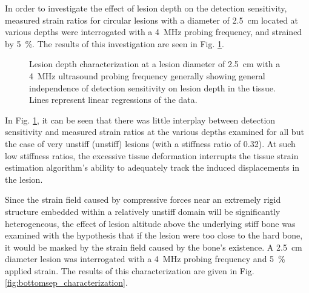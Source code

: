 			In order to investigate the effect of lesion depth on the detection sensitivity, measured strain ratios for circular lesions with a diameter of \SI{2.5}{\cm} located at various depths were interrogated with a \SI{4}{\MHz} probing frequency, and strained by \SI{5}{\percent}. The results of this investigation are seen in Fig. \ref{fig:depth_characterization}.

			\begin{figure}[!htb]
				\centering
				\caption[Quasi-static lesion depth characterization]{Lesion depth characterization at a lesion diameter of \SI{2.5}{\cm} with a \SI{4}{\MHz} ultrasound probing frequency generally showing general independence of detection sensitivity on lesion depth in the tissue. Lines represent linear regressions of the data.}
				\label{fig:depth_characterization}
			\end{figure}

			In Fig. \ref{fig:depth_characterization}, it can be seen that there was little interplay between detection sensitivity and measured strain ratios at the various depths examined for all but the case of very unstiff (unstiff) lesions (with a stiffness ratio of 0.32). At such low stiffness ratios, the excessive tissue deformation interrupts the tissue strain estimation algorithm's ability to adequately track the induced displacements in the lesion.

			Since the strain field caused by compressive forces near an extremely rigid structure embedded within a relatively unstiff domain will be significantly heterogeneous, the effect of lesion altitude above the underlying stiff bone was examined with the hypothesis that if the lesion were too close to the hard bone, it would be masked by the strain field caused by the bone's existence. A \SI{2.5}{\cm} diameter lesion was interrogated with a \SI{4}{\MHz} probing frequency and \SI{5}{\percent} applied strain. The results of this characterization are given in Fig. \ref{fig:bottomsep_characterization}.

